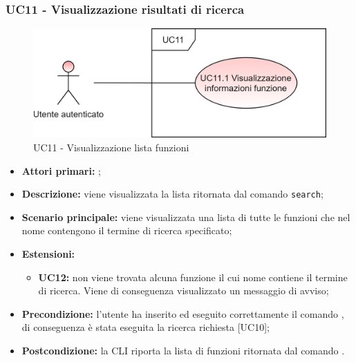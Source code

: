 \subsubsection{UC11 - Visualizzazione risultati di ricerca}
\begin{figure}[H]
	\centering
	\includegraphics[scale=\ucs]{./res/img/UC11.png}
	\caption {UC11 - Visualizzazione lista funzioni}
\end{figure}
\begin{itemize}
	\item \textbf{Attori primari:} \ua{};
	\item \textbf{Descrizione:} viene visualizzata la lista ritornata dal comando \texttt{search};
	\item \textbf{Scenario principale:} viene visualizzata una lista di tutte le funzioni che nel nome contengono il termine di ricerca specificato;
	\item \textbf{Estensioni:} 
	\begin{itemize}
		\item \textbf{UC12:} non viene trovata alcuna funzione il cui nome contiene il termine di ricerca. Viene di conseguenza visualizzato un messaggio di avviso;
	\end{itemize}
	\item \textbf{Precondizione:} l’utente ha inserito ed eseguito correttamente il comando \search{}, di conseguenza è stata eseguita la ricerca richiesta [UC10];
	\item \textbf{Postcondizione:} la CLI riporta la lista di funzioni ritornata dal comando \search{}.
\end{itemize}